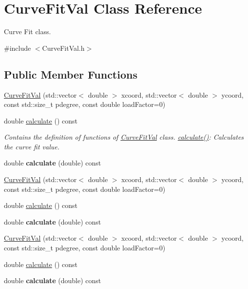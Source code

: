 \hypertarget{class_curve_fit_val}{}\section{Curve\+Fit\+Val Class Reference}
\label{class_curve_fit_val}


Curve Fit class.  




{\ttfamily \#include $<$Curve\+Fit\+Val.\+h$>$}

\subsection*{Public Member Functions}
\begin{DoxyCompactItemize}
\item 
\hyperlink{class_curve_fit_val_ab7e5e250ea748ec116e2720b85a01853}{Curve\+Fit\+Val} (std\+::vector$<$ double $>$ xcoord, std\+::vector$<$ double $>$ ycoord, const std\+::size\+\_\+t pdegree, const double load\+Factor=0)
\item 
double \hyperlink{class_curve_fit_val_af928003c67aed9c644632a548be08713}{calculate} () const
\begin{DoxyCompactList}\small\item\em Contains the definition of functions of \hyperlink{class_curve_fit_val}{Curve\+Fit\+Val} class. \hyperlink{class_curve_fit_val_af928003c67aed9c644632a548be08713}{calculate()}\+: Calculates the curve fit value. \end{DoxyCompactList}\item 
\mbox{\label{class_curve_fit_val_ac7f8efea0e525b4294fd17e085434b97}} 
double {\bfseries calculate} (double) const
\item 
\hyperlink{class_curve_fit_val_ab7e5e250ea748ec116e2720b85a01853}{Curve\+Fit\+Val} (std\+::vector$<$ double $>$ xcoord, std\+::vector$<$ double $>$ ycoord, const std\+::size\+\_\+t pdegree, const double load\+Factor=0)
\item 
double \hyperlink{class_curve_fit_val_af928003c67aed9c644632a548be08713}{calculate} () const
\item 
\mbox{\label{class_curve_fit_val_ac7f8efea0e525b4294fd17e085434b97}} 
double {\bfseries calculate} (double) const
\item 
\hyperlink{class_curve_fit_val_ab7e5e250ea748ec116e2720b85a01853}{Curve\+Fit\+Val} (std\+::vector$<$ double $>$ xcoord, std\+::vector$<$ double $>$ ycoord, const std\+::size\+\_\+t pdegree, const double load\+Factor=0)
\item 
double \hyperlink{class_curve_fit_val_af928003c67aed9c644632a548be08713}{calculate} () const
\item 
\mbox{\label{class_curve_fit_val_ac7f8efea0e525b4294fd17e085434b97}} 
double {\bfseries calculate} (double) const
\end{DoxyCompactItemize}


